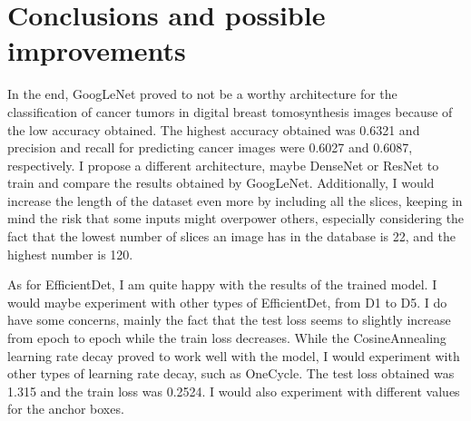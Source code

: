 \chapter{Conclusions and possible improvements}
\label{chap:ch6}

In the end, GoogLeNet proved to not be a worthy architecture for the classification of cancer tumors in digital breast tomosynthesis images because of the low accuracy obtained. The highest accuracy obtained was 0.6321 and precision and recall for predicting cancer images were 0.6027 and 0.6087, respectively. I propose a different architecture, maybe DenseNet or ResNet to train and compare the results obtained by GoogLeNet. Additionally, I would increase the length of the dataset even more by including all the slices, keeping in mind the risk that some inputs might overpower others, especially considering the fact that the lowest number of slices an image has in the database is 22, and the highest number is 120.

As for EfficientDet, I am quite happy with the results of the trained model. I would maybe experiment with other types of EfficientDet, from D1 to D5. I do have some concerns, mainly the fact that the test loss seems to slightly increase from epoch to epoch while the train loss decreases. While the CosineAnnealing learning rate decay proved to work well with the model, I would experiment with other types of learning rate decay, such as OneCycle. The test loss obtained was 1.315 and the train loss was 0.2524. I would also experiment with different values for the anchor boxes.
